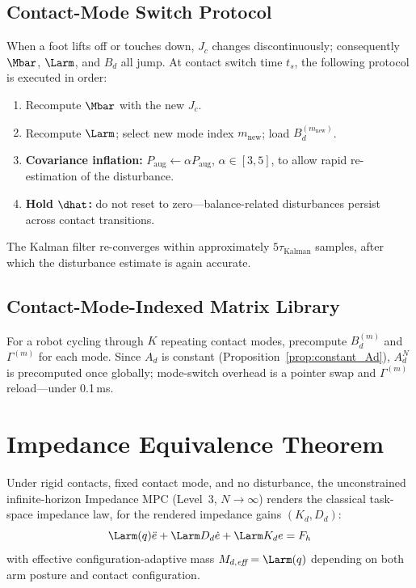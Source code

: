 \subsection{Contact-Mode Switch Protocol}

When a foot lifts off or touches down, $J_c$ changes discontinuously;
consequently $\Mbar$, $\Larm$, and $B_d$ all jump.
At contact switch time $t_s$, the following protocol is executed in order:
\begin{enumerate}
  \item Recompute $\Mbar$ with the new $J_c$.
  \item Recompute $\Larm$; select new mode index $m_{\text{new}}$; load $B_d^{(m_{\text{new}})}$.
  \item \textbf{Covariance inflation:} $P_{\text{aug}}\leftarrow\alpha P_{\text{aug}}$,
        $\alpha\in[3,5]$, to allow rapid re-estimation of the disturbance.
  \item \textbf{Hold $\dhat$:} do not reset to zero---balance-related
        disturbances persist across contact transitions.
\end{enumerate}
The Kalman filter re-converges within approximately $5\tau_{\text{Kalman}}$
samples, after which the disturbance estimate is again accurate.

\subsection{Contact-Mode-Indexed Matrix Library}

For a robot cycling through $K$ repeating contact modes, precompute
$B_d^{(m)}$ and $\Gamma^{(m)}$ for each mode.
Since $A_d$ is constant (Proposition~\ref{prop:constant_Ad}), $A_d^N$ is
precomputed once globally; mode-switch overhead is a pointer swap and
$\Gamma^{(m)}$ reload---under 0.1\,ms.

\section{Impedance Equivalence Theorem}\label{sec:theorem}

\begin{theorem}\label{thm:equivalence}
Under rigid contacts, fixed contact mode, and no disturbance, the
unconstrained infinite-horizon Impedance MPC (Level~3, $N\to\infty$)
renders the classical task-space impedance law, for the rendered impedance
gains $(K_d,D_d)$:
\begin{equation}\label{eq:impedance}
  \Larm(q)\ddot{e}+\Larm D_d\dot{e}+\Larm K_d e = F_h
\end{equation}
with effective configuration-adaptive mass $M_{d,\emph{eff}}=\Larm(q)$
depending on both arm posture and contact configuration.
\end{theorem}


